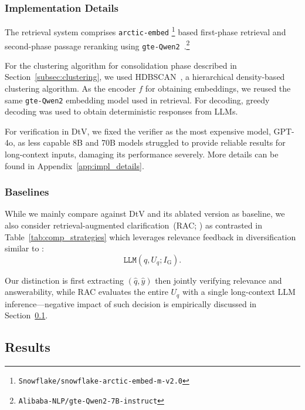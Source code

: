 \subsubsection{Implementation Details}
\label{subsubsec:implt_details}

The retrieval system comprises \texttt{arctic-embed} \citep{merrick-etal-2024-arctic-arxiv}\footnote{\texttt{Snowflake/snowflake-arctic-embed-m-v2.0}} based first-phase retrieval and second-phase passage reranking using \texttt{gte-Qwen2}~\citep{li-etal-2023-towards-arxiv}.\footnote{\texttt{Alibaba-NLP/gte-Qwen2-7B-instruct}}

For the clustering algorithm for consolidation phase described in Section~\ref{subsec:clustering}, we used HDBSCAN~\citep{campello-etal-2013-density-pakdd}, a hierarchical density-based clustering algorithm.
As the encoder $f$ for obtaining embeddings, we reused the same \texttt{gte-Qwen2} embedding model used in retrieval.
For decoding, greedy decoding was used to obtain deterministic responses from LLMs.

For verification in DtV, we fixed the verifier as the most expensive model, GPT-4o, as less capable 8B and 70B models struggled to provide reliable results for long-context inputs, damaging its performance severely.
More details can be found in Appendix~\ref{app:impl_details}.

\subsubsection{Baselines}
\label{subsubsec:baselines}



While we mainly compare \ours against DtV and its ablated version as baseline,
we also consider retrieval-augmented clarification~(RAC; \citealp{kim-etal-2023-tree})
as contrasted in Table~\ref{tab:comp_strategies}
which leverages relevance feedback
in diversification similar to \ours:
\begin{equation}
\texttt{LLM}(q, U_q; I_{\textrm{G}}).
\label{eq:rac}
\end{equation}

Our distinction is
first extracting
$(\hat{q},\hat{y})$
then jointly verifying relevance and answerability,
while RAC evaluates the entire $U_q$ with a single long-context LLM inference---negative impact of such decision is empirically discussed in Section~\ref{sec:results}.


\subsection{Results}\label{sec:results}

